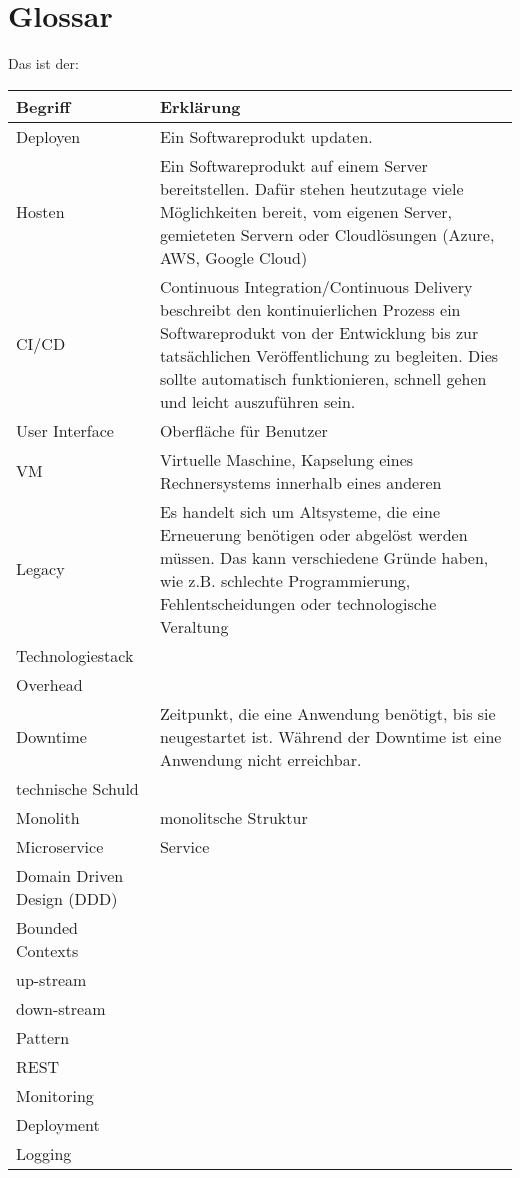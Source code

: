 \section{Glossar}

Das ist der:

	\begin{longtable}[center]{lp{10cm}}
				Begriff & Erklärung \\ \hline
				Deployen & Ein Softwareprodukt updaten.  \\
				Hosten & Ein Softwareprodukt auf einem Server bereitstellen. Dafür stehen heutzutage viele Möglichkeiten bereit, vom eigenen Server, gemieteten Servern oder Cloudlösungen (Azure, AWS, Google Cloud) \\
				CI/CD & Continuous Integration/Continuous Delivery beschreibt den kontinuierlichen Prozess ein Softwareprodukt von der Entwicklung bis zur tatsächlichen Veröffentlichung zu begleiten. Dies sollte automatisch funktionieren, schnell gehen und leicht auszuführen sein.  \\
				User Interface  & Oberfläche für Benutzer  \\
				VM & Virtuelle Maschine, Kapselung eines Rechnersystems innerhalb eines anderen  \\
				Legacy & Es handelt sich um Altsysteme, die eine Erneuerung benötigen oder abgelöst werden müssen. Das kann verschiedene Gründe haben, wie z.B. schlechte Programmierung, Fehlentscheidungen oder technologische Veraltung   \\
				Technologiestack &   \\
				Overhead &   \\
				Downtime & Zeitpunkt, die eine Anwendung benötigt, bis sie neugestartet ist. Während der Downtime ist eine Anwendung nicht erreichbar.  \\
				technische Schuld &   \\
				Monolith & monolitsche Struktur \\
				Microservice & Service  \\	
				Domain Driven Design (DDD) &  \\	
				Bounded Contexts & \\
				up-stream & \\
				down-stream & \\
				Pattern & \\
				REST & \\
				Monitoring & \\
				Deployment & \\
				Logging & \\

\end{longtable}
